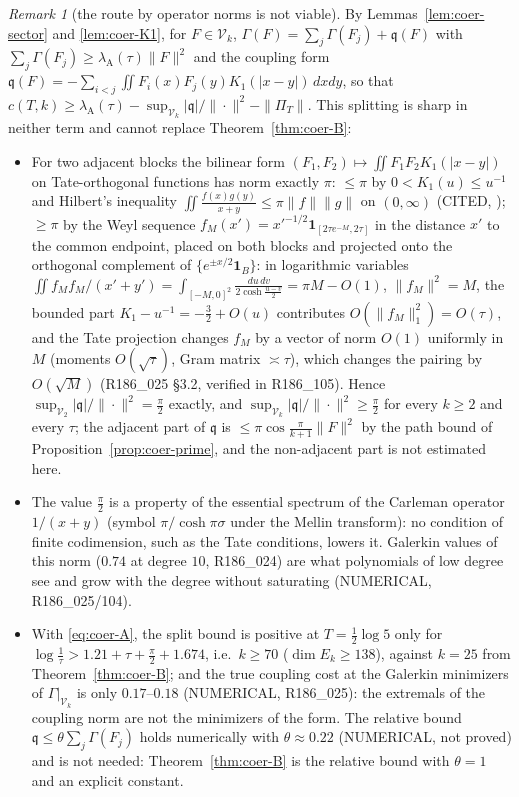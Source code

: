 \documentclass[11pt]{amsart}
\theoremstyle{definition}
\theoremstyle{remark}
\newtheorem{remark}[theorem]{Remark}
\newcommand{\PiT}{\Pi_T}
\begin{document}
\begin{remark}[the route by operator norms is not viable]\label{rem:coer-nogo}
By Lemmas~\ref{lem:coer-sector} and \ref{lem:coer-K1}, for $F\in\mathcal V_k$,
$\Gamma(F)=\sum_j\Gamma(F_j)+\mathfrak q(F)$ with $\sum_j\Gamma(F_j)\ge\lambda_{\mathrm A}(\tau)\|F\|^2$ and the coupling form
$\mathfrak q(F)=-\sum_{i<j}\iint F_i(x)F_j(y)K_1(|x-y|)\,dxdy$, so that
$c(T,k)\ge\lambda_{\mathrm A}(\tau)-\sup_{\mathcal V_k}|\mathfrak q|/\|\cdot\|^2-\|\PiT\|$. This splitting is sharp in neither
term and cannot replace Theorem~\ref{thm:coer-B}:
\begin{itemize}
\item[(a)] For two adjacent blocks the bilinear form $(F_1,F_2)\mapsto\iint F_1F_2K_1(|x-y|)$ on Tate-orthogonal
functions has norm exactly $\pi$: $\le\pi$ by $0<K_1(u)\le u^{-1}$ and Hilbert's inequality
$\iint\frac{f(x)g(y)}{x+y}\le\pi\|f\|\|g\|$ on $(0,\infty)$ (CITED, \cite[Thm.~316]{HLP}); $\ge\pi$ by the Weyl sequence
$f_M(x')=x'^{-1/2}\mathbf 1_{[2\tau e^{-M},2\tau]}$ in the distance $x'$ to the common endpoint, placed on both blocks and
projected onto the orthogonal complement of $\{e^{\pm x/2}\mathbf 1_B\}$: in logarithmic variables
$\iint f_Mf_M/(x'+y')=\int_{[-M,0]^2}\frac{du\,dv}{2\cosh\frac{u-v}2}=\pi M-O(1)$, $\|f_M\|^2=M$, the bounded part
$K_1-u^{-1}=-\frac32+O(u)$ contributes $O(\|f_M\|_1^2)=O(\tau)$, and the Tate projection changes $f_M$ by a vector of norm
$O(1)$ uniformly in $M$ (moments $O(\sqrt\tau)$, Gram matrix $\asymp\tau$), which changes the pairing by $O(\sqrt M)$
(R186\_025 \S3.2, verified in R186\_105). Hence $\sup_{\mathcal V_2}|\mathfrak q|/\|\cdot\|^2=\frac\pi2$ exactly, and
$\sup_{\mathcal V_k}|\mathfrak q|/\|\cdot\|^2\ge\frac\pi2$ for every $k\ge2$ and every $\tau$; the adjacent part of
$\mathfrak q$ is $\le\pi\cos\frac\pi{k+1}\|F\|^2$ by the path bound of Proposition~\ref{prop:coer-prime}, and the
non-adjacent part is not estimated here.
\item[(b)] The value $\frac\pi2$ is a property of the essential spectrum of the Carleman operator $1/(x+y)$ (symbol
$\pi/\cosh\pi\sigma$ under the Mellin transform): no condition of finite codimension, such as the Tate conditions,
lowers it. Galerkin values of this norm ($0.74$ at degree $10$, R186\_024) are what polynomials of low degree see and
grow with the degree without saturating (NUMERICAL, R186\_025/104).
\item[(c)] With \eqref{eq:coer-A}, the split bound is positive at $T=\frac12\log5$ only for
$\log\frac1\tau>1.21+\tau+\frac\pi2+1.674$, i.e.\ $k\ge70$ ($\dim E_k\ge138$), against $k=25$ from
Theorem~\ref{thm:coer-B}; and the true coupling cost at the Galerkin minimizers of $\Gamma|_{\mathcal V_k}$ is only
$0.17$--$0.18$ (NUMERICAL, R186\_025): the extremals of the coupling norm are not the minimizers of the form. The
relative bound $\mathfrak q\le\theta\sum_j\Gamma(F_j)$ holds numerically with $\theta\approx0.22$ (NUMERICAL, not proved)
and is not needed: Theorem~\ref{thm:coer-B} is the relative bound with $\theta=1$ and an explicit constant.
\end{itemize}
\end{remark}
\end{document}
